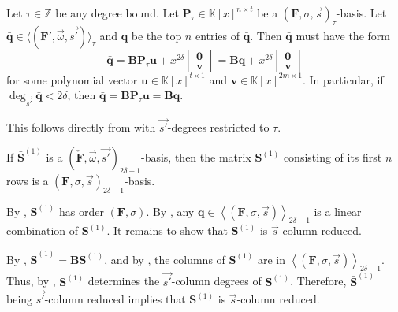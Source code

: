 \begin{cor}
\label{cor:FtauBasisForm}Let $\tau\in\mathbb{Z}$ be any degree bound.
Let $\mathbf{P}_{\tau}\in\mathbb{K}\left[x\right]^{n\times t}$ be
a $\left(\mathbf{F},\sigma,\vec{s}\right)_{\tau}$-basis. Let $\bar{\mathbf{q}}\in\langle(\mathbf{F}',\vec{\omega},\vec{s'})\rangle_{\tau}$
and $\mathbf{q}$ be the top $n$ entries of $\bar{\mathbf{q}}$.
Then $\bar{\mathbf{q}}$ must have the form \[
\bar{\mathbf{q}}=\mathbf{B}\mathbf{P}_{\tau}\mathbf{u}+x^{2\delta}\begin{bmatrix}\mathbf{0}\\
\mathbf{v}\end{bmatrix}=\mathbf{B}\mathbf{q}+x^{2\delta}\begin{bmatrix}\mathbf{0}\\
\mathbf{v}\end{bmatrix}\]
 for some polynomial vector $\mathbf{u}\in\mathbb{K}\left[x\right]^{t\times1}$
and $\mathbf{v}\in\mathbb{K}\left[x\right]^{2m\times1}$. In particular,
if $\deg_{\vec{s'}}\bar{\mathbf{q}}<2\delta$, then $\bar{\mathbf{q}}=\mathbf{B}\mathbf{P}_{\tau}\mathbf{u}=\mathbf{B}\mathbf{q}$. \end{cor}
\begin{pf}
This follows directly from  with $\vec{s'}$-degrees
restricted to $\tau$.\end{pf}
\begin{lem}
\label{lem:2delta-1Basis}If $\bar{\mathbf{S}}^{\left(1\right)}$
is a $(\check{\mathbf{F}},\vec{\omega},\vec{s'})_{2\delta-1}$-basis,
then the matrix $\mathbf{S}^{\left(1\right)}$ consisting of its first
$n$ rows is a $\left(\mathbf{F},\sigma,\vec{s}\right)_{2\delta-1}$-basis.\end{lem}
\begin{pf}
By , $\mathbf{S}^{\left(1\right)}$ has
order $\left(\mathbf{F},\sigma\right)$. By ,
any $\mathbf{q}\in\left\langle \left(\mathbf{F},\sigma,\vec{s}\right)\right\rangle _{2\delta-1}$
is a linear combination of $\mathbf{S}^{\left(1\right)}$. It remains
to show that $\mathbf{S}^{\left(1\right)}$ is $\vec{s}$-column reduced.

By , $\bar{\mathbf{S}}^{\left(1\right)}=\mathbf{B}\mathbf{S}^{\left(1\right)}$,
and by , the columns of $\mathbf{S}^{\left(1\right)}$
are in $\left\langle \left(\mathbf{F},\sigma,\vec{s}\right)\right\rangle _{2\delta-1}$.
Thus, by , $\mathbf{S}^{\left(1\right)}$
determines the $\vec{s'}$-column degrees of $\mathbf{S}^{\left(1\right)}$.
Therefore, $\bar{\mathbf{S}}^{\left(1\right)}$ being $\vec{s'}$-column
reduced implies that $\mathbf{S}^{\left(1\right)}$ is $\vec{s}$-column
reduced.\end{pf}
